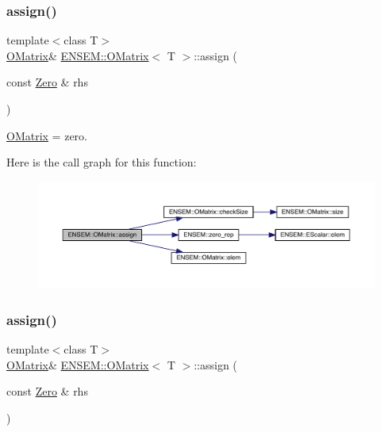 \subsubsection{\texorpdfstring{assign()}{assign()}\hspace{0.1cm}{\footnotesize\ttfamily [2/9]}}
{\footnotesize\ttfamily template$<$class T$>$ \\
\mbox{\hyperlink{classENSEM_1_1OMatrix}{O\+Matrix}}\& \mbox{\hyperlink{classENSEM_1_1OMatrix}{E\+N\+S\+E\+M\+::\+O\+Matrix}}$<$ T $>$\+::assign (\begin{DoxyParamCaption}\item[{const \mbox{\hyperlink{structENSEM_1_1Zero}{Zero}} \&}]{rhs }\end{DoxyParamCaption})\hspace{0.3cm}{\ttfamily [inline]}}



\mbox{\hyperlink{classENSEM_1_1OMatrix}{O\+Matrix}} = zero. 

Here is the call graph for this function\+:
\nopagebreak
\begin{figure}[H]
\begin{center}
\leavevmode
\includegraphics[width=350pt]{dd/d80/classENSEM_1_1OMatrix_a9b8826edfb36e1bc701a7778424cfe31_cgraph}
\end{center}
\end{figure}
\mbox{\label{classENSEM_1_1OMatrix_a9b8826edfb36e1bc701a7778424cfe31}} 
\subsubsection{\texorpdfstring{assign()}{assign()}\hspace{0.1cm}{\footnotesize\ttfamily [3/9]}}
{\footnotesize\ttfamily template$<$class T$>$ \\
\mbox{\hyperlink{classENSEM_1_1OMatrix}{O\+Matrix}}\& \mbox{\hyperlink{classENSEM_1_1OMatrix}{E\+N\+S\+E\+M\+::\+O\+Matrix}}$<$ T $>$\+::assign (\begin{DoxyParamCaption}\item[{const \mbox{\hyperlink{structENSEM_1_1Zero}{Zero}} \&}]{rhs }\end{DoxyParamCaption})\hspace{0.3cm}{\ttfamily [inline]}}



